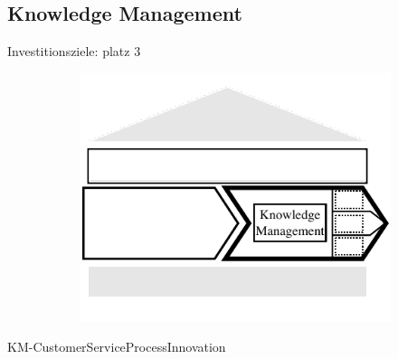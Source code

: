		

	\subsection{Knowledge Management}
	Investitionsziele: platz 3 \citep{ccnet2016}
	\begin{figure}[caption={Knowlege Management detail process}, label={fig:knowledge}]
		\begin{subfigure}[b]{.45\textwidth}
			\begin{center}
				\includegraphics{figures/knowledgemanagement.pdf}
			\end{center}
		\end{subfigure}
	\begin{subfigure}[b]{.45\textwidth}
		\begin{center}
		\end{center}
	\end{subfigure}
	
\end{figure}

	KM-CustomerServiceProcessInnovation

